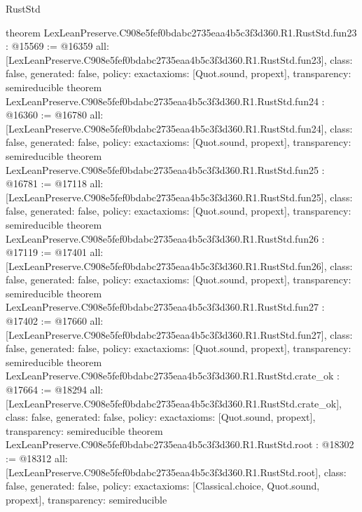 \begin{lexlean}{RustStd}
\begin{coremodule}
{}
theorem LexLeanPreserve.C908e5fef0bdabc2735eaa4b5c3f3d360.R1.RustStd.fun23 : @15569 := @16359 {
  all: [LexLeanPreserve.C908e5fef0bdabc2735eaa4b5c3f3d360.R1.RustStd.fun23],
  class: false,
  generated: false,
  policy: exact{axioms: [Quot.sound, propext]},
  transparency: semireducible
}
theorem LexLeanPreserve.C908e5fef0bdabc2735eaa4b5c3f3d360.R1.RustStd.fun24 : @16360 := @16780 {
  all: [LexLeanPreserve.C908e5fef0bdabc2735eaa4b5c3f3d360.R1.RustStd.fun24],
  class: false,
  generated: false,
  policy: exact{axioms: [Quot.sound, propext]},
  transparency: semireducible
}
theorem LexLeanPreserve.C908e5fef0bdabc2735eaa4b5c3f3d360.R1.RustStd.fun25 : @16781 := @17118 {
  all: [LexLeanPreserve.C908e5fef0bdabc2735eaa4b5c3f3d360.R1.RustStd.fun25],
  class: false,
  generated: false,
  policy: exact{axioms: [Quot.sound, propext]},
  transparency: semireducible
}
theorem LexLeanPreserve.C908e5fef0bdabc2735eaa4b5c3f3d360.R1.RustStd.fun26 : @17119 := @17401 {
  all: [LexLeanPreserve.C908e5fef0bdabc2735eaa4b5c3f3d360.R1.RustStd.fun26],
  class: false,
  generated: false,
  policy: exact{axioms: [Quot.sound, propext]},
  transparency: semireducible
}
theorem LexLeanPreserve.C908e5fef0bdabc2735eaa4b5c3f3d360.R1.RustStd.fun27 : @17402 := @17660 {
  all: [LexLeanPreserve.C908e5fef0bdabc2735eaa4b5c3f3d360.R1.RustStd.fun27],
  class: false,
  generated: false,
  policy: exact{axioms: [Quot.sound, propext]},
  transparency: semireducible
}
theorem LexLeanPreserve.C908e5fef0bdabc2735eaa4b5c3f3d360.R1.RustStd.crate_ok : @17664 := @18294 {
  all: [LexLeanPreserve.C908e5fef0bdabc2735eaa4b5c3f3d360.R1.RustStd.crate_ok],
  class: false,
  generated: false,
  policy: exact{axioms: [Quot.sound, propext]},
  transparency: semireducible
}
theorem LexLeanPreserve.C908e5fef0bdabc2735eaa4b5c3f3d360.R1.RustStd.root : @18302 := @18312 {
  all: [LexLeanPreserve.C908e5fef0bdabc2735eaa4b5c3f3d360.R1.RustStd.root],
  class: false,
  generated: false,
  policy: exact{axioms: [Classical.choice, Quot.sound, propext]},
  transparency: semireducible
}


\end{coremodule}
\end{lexlean}

